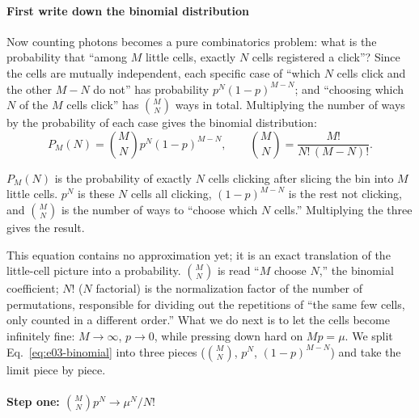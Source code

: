 \paragraph{First write down the binomial distribution}

Now counting photons becomes a pure combinatorics problem: what is the probability that ``among $M$ little cells, exactly $N$ cells registered a click''? Since the cells are mutually independent, each specific case of ``which $N$ cells click and the other $M-N$ do not'' has probability $p^{N}(1-p)^{M-N}$; and ``choosing which $N$ of the $M$ cells click'' has $\binom{M}{N}$ ways in total. Multiplying the number of ways by the probability of each case gives the binomial distribution:
\begin{equation}
  P_M(N)=\binom{M}{N}p^{N}(1-p)^{M-N},
  \qquad \binom{M}{N}=\frac{M!}{N!\,(M-N)!}.
  \label{eq:e03-binomial}
\end{equation}
\begin{formulaexplain}
$P_M(N)$ is the probability of exactly $N$ cells clicking after slicing the bin into $M$ little cells. $p^{N}$ is these $N$ cells all clicking, $(1-p)^{M-N}$ is the rest not clicking, and $\binom{M}{N}$ is the number of ways to ``choose which $N$ cells.'' Multiplying the three gives the result.
\end{formulaexplain}
This equation contains no approximation yet; it is an exact translation of the little-cell picture into a probability. $\binom{M}{N}$ is read ``$M$ choose $N$,'' the binomial coefficient; $N!$ ($N$ factorial) is the normalization factor of the number of permutations, responsible for dividing out the repetitions of ``the same few cells, only counted in a different order.'' What we do next is to let the cells become infinitely fine: $M\to\infty$, $p\to0$, while pressing down hard on $Mp=\mu$. We split Eq.~\eqref{eq:e03-binomial} into three pieces ($\binom{M}{N}$, $p^N$, $(1-p)^{M-N}$) and take the limit piece by piece.

\paragraph{\texorpdfstring{Step one: $\binom{M}{N}p^{N}\to \mu^{N}/N!$}{Step one: the limit of the binomial-coefficient term}}

